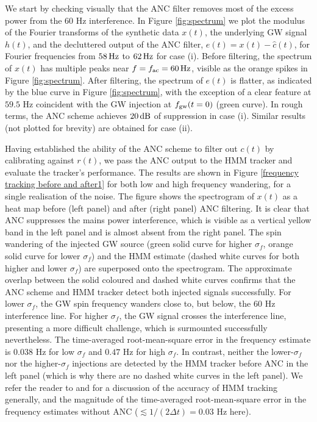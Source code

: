 \documentclass[pra,superscriptaddress,reprint,amsmath,amssymb,nofootinbib]{revtex4-2}
\begin{document}
We start by checking visually that the ANC filter removes most of the excess power from the 60 Hz interference. In Figure \ref{fig:spectrum} we plot the modulus of the Fourier transforms of the synthetic data $x(t)$, the underlying GW signal $h(t)$, and the decluttered output of the ANC filter, $e(t) = x(t) - \hat{c}(t)$, for Fourier frequencies from $58 \, {\rm Hz}$ to $62 \, {\rm Hz}$ for case (i). Before filtering, the spectrum of $x(t)$ has multiple peaks near $f = f_{\rm ac} = 60 \, {\rm Hz}$, visible as the orange spikes in Figure \ref{fig:spectrum}. After filtering, the spectrum of $e(t)$ is flatter, as indicated by the blue curve in Figure \ref{fig:spectrum}, with the exception of a clear feature at $59.5$ Hz coincident with the GW injection at $f_{\rm gw}(t=0)$ (green curve). In rough terms, the ANC scheme achieves $20 \, {\rm dB}$ of suppression in case (i). Similar results (not plotted for brevity) are obtained for case (ii). \newline 
 
Having established the ability of the ANC scheme to filter out $c(t)$ by calibrating against $r(t)$, we pass the ANC output to the HMM tracker and evaluate the tracker's performance. The results are shown in  Figure \ref{frequency tracking before and after1} for both low and high frequency wandering, for a single realisation of the noise. The figure shows the spectrogram of $x(t)$ as a heat map before (left panel) and after (right panel) ANC filtering. It is clear that ANC suppresses the mains power interference, which is visible as a vertical yellow band in the left panel and is almost absent from the right panel. The spin wandering of the injected GW source (green solid curve for higher $\sigma_f$, orange solid curve for lower $\sigma_f$) and the HMM estimate (dashed white curves for both higher and lower $\sigma_f$) are superposed onto the spectrogram. The approximate overlap between the solid coloured and dashed white curves confirms that the ANC scheme and HMM tracker detect both injected signals successfully. For lower $\sigma_f$, the GW spin frequency wanders close to, but below, the 60 Hz interference line. For higher $\sigma_f$, the GW signal crosses the interference line, presenting a more difficult challenge, which is surmounted successfully nevertheless. The time-averaged root-mean-square error in the frequency estimate is $0.038$ Hz for low $\sigma_f $ and $0.47$ Hz for high $\sigma_f$. In contrast, neither the lower-$\sigma_f$ nor the higher-$\sigma_f$ injections are detected by the HMM tracker before ANC in the left panel (which is why there are no dashed white curves in the left panel). We refer the reader to \cite{Suvorova2016PhRv} and \cite{2017PhRvD..96j2006S} for a discussion of the accuracy of HMM tracking generally, and the magnitude of the time-averaged root-mean-square error in the frequency estimates without ANC ($\lesssim 1/(2\Delta t) = 0.03$ Hz here).
\end{document}
